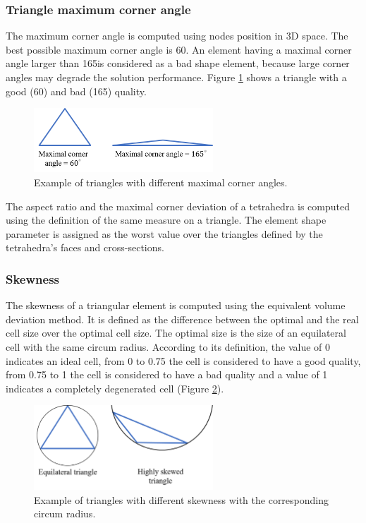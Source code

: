 \subsubsection*{Triangle maximum corner angle}
The maximum corner angle is computed using nodes position in 3D space. The best possible maximum corner angle is 60\textdegree. An element having a maximal corner angle larger than 165\textdegree is considered as a bad shape element, because large corner angles may degrade the solution performance. Figure \ref{fig:cornerangle} shows a triangle with a good (60\textdegree) and bad (165\textdegree) quality. 

 \begin{figure}[!h]
\centering
\includegraphics[width=0.6\textwidth,keepaspectratio]{figures/maximalcornerangle.png} 
\caption{Example of triangles with different maximal corner angles.}
\label{fig:cornerangle}
\end{figure} 

The aspect ratio and the maximal corner deviation of a tetrahedra is computed using the definition of the same measure on a triangle. The element shape parameter is assigned as the worst value over the triangles defined by the tetrahedra's faces and cross-sections.  

\subsubsection*{Skewness }
The skewness of a triangular element is computed using the equivalent volume deviation method. It is defined as the difference between the optimal and the real cell size over the optimal cell size. The optimal size is the size of an equilateral cell with the same circum radius. According to its definition, the value of 0 indicates an ideal cell, from 0 to 0.75 the cell is considered to have a good quality, from 0.75 to 1 the cell is considered to have a bad quality and a value of 1 indicates a completely degenerated cell (Figure \ref{fig:skewness}).   

 \begin{figure}[!h]
\centering
\includegraphics[width=0.6\textwidth,keepaspectratio]{figures/skewness.png} 
\caption{Example of triangles with different skewness with the corresponding circum radius.}
\label{fig:skewness}
\end{figure}
 
